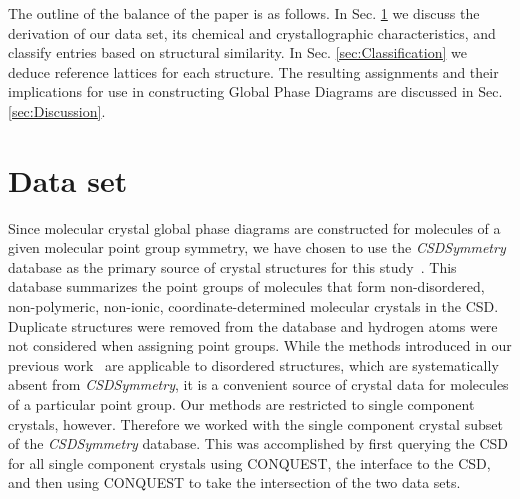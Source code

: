 \documentclass[preprint]{iucr}              %
\begin{document}
The outline of the balance of the paper is as follows. In Sec. \ref{sec:Data} we discuss the derivation of our data set, its chemical and crystallographic characteristics, and classify entries based on structural similarity. In Sec. \ref{sec:Classification} we deduce reference lattices for each structure.  The resulting assignments and their implications for use in constructing Global Phase Diagrams are discussed in Sec. \ref{sec:Discussion}.

\section{Data set}
\label{sec:Data}

Since molecular crystal global phase diagrams are constructed for molecules of a given molecular point group symmetry, we have chosen to use the \emph{CSDSymmetry} database as the primary source of crystal structures for this study~\cite{Yao02}. This database summarizes the point groups of molecules that form non-disordered, non-polymeric, non-ionic, coordinate-determined molecular crystals in the CSD.  Duplicate structures were removed from the database and hydrogen atoms were not considered when assigning point groups. While the methods introduced in our previous work~\cite{Mettes04} are applicable to disordered structures, which are systematically absent from \emph{CSDSymmetry}, it is a convenient source of crystal data for molecules of a particular point group. Our methods are restricted to single component crystals, however. Therefore we worked with the single component crystal subset of the \emph{CSDSymmetry} database.  This was accomplished by first querying the CSD for all single component crystals using {C\small ONQUEST}, the interface to the CSD, and then using {C\small ONQUEST} to take the intersection of the two data sets.
\end{document}
